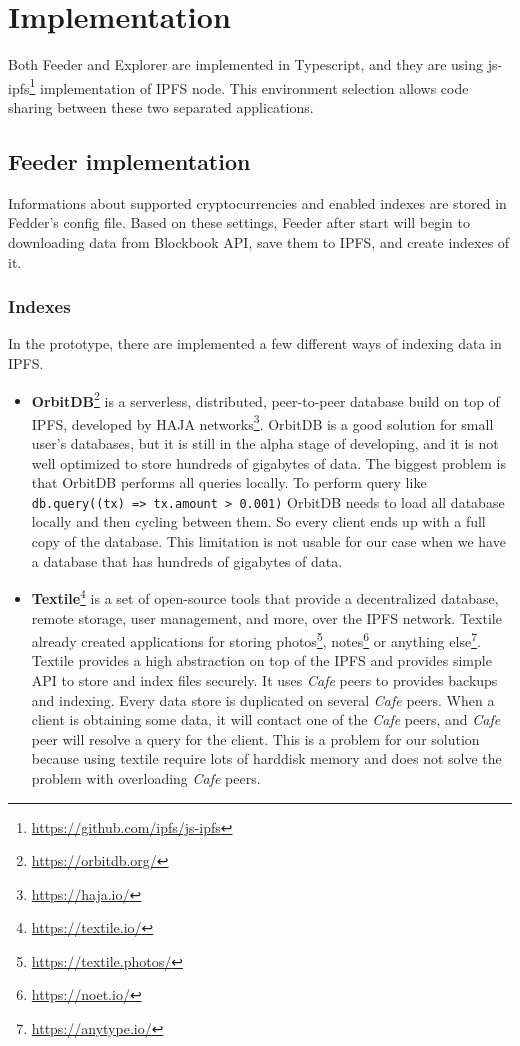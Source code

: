 \chapter{Implementation}
\label{Implementation}

Both Feeder and Explorer are implemented in Typescript, and they are using js-ipfs\footnote{\url{https://github.com/ipfs/js-ipfs}} implementation of IPFS node. This environment selection allows code sharing between these two separated applications.

\section{Feeder implementation}
Informations about supported cryptocurrencies and enabled indexes are stored in Fedder's config file. Based on these settings, Feeder after start will begin to downloading data from Blockbook API, save them to IPFS, and create indexes of it.

\subsection{Indexes}
In the prototype, there are implemented a few different ways of indexing data in IPFS.
\begin{itemize}
    \item \textbf{OrbitDB}\footnote{\url{https://orbitdb.org/}} is a serverless, distributed, peer-to-peer database build on top of IPFS, developed by HAJA networks\footnote{\url{https://haja.io/}}. OrbitDB is a good solution for small user's databases, but it is still in the alpha stage of developing, and it is not well optimized to store hundreds of gigabytes of data. The biggest problem is that OrbitDB performs all queries locally. To perform query like \texttt{db.query((tx) => tx.amount > 0.001)} OrbitDB needs to load all database locally and then cycling between them. So every client ends up with a full copy of the database. This limitation is not usable for our case when we have a database that has hundreds of gigabytes of data.
    \cite{OrbitDBManual}
    \item \textbf{Textile}\footnote{\url{https://textile.io/}} is a set of open-source tools that provide a decentralized database, remote storage, user management, and more, over the IPFS network. Textile already created applications for storing photos\footnote{\url{https://textile.photos/}}, notes\footnote{\url{https://noet.io/}} or anything else\footnote{\url{https://anytype.io/}}. Textile provides a high abstraction on top of the IPFS and provides simple API to store and index files securely. It uses \textit{Cafe} peers to provides backups and indexing. Every data store is duplicated on several \textit{Cafe} peers. When a client is obtaining some data, it will contact one of the \textit{Cafe} peers, and \textit{Cafe} peer will resolve a query for the client. This is a problem for our solution because using textile require lots of harddisk memory and does not solve the problem with overloading \textit{Cafe} peers.
    \cite{TextileWhitePaper}
\end{itemize}


